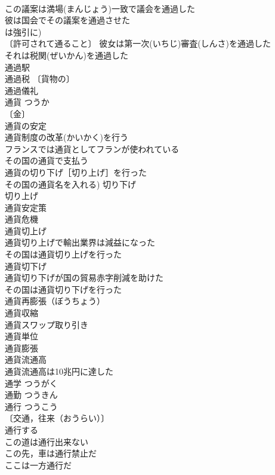 \documentclass[8pt]{extreport}
\begin{document}
\begin{CJK}{UTF8}{min}
\\	この議案は満場(まんじょう)一致で議会を通過した 
\\	彼は国会でその議案を通過させた 
\\	は強引に) 
\\	〔許可されて通ること〕 彼女は第一次(いちじ)審査(しんさ)を通過した 
\\	それは税関(ぜいかん)を通過した 
\\	通過駅 
\\	通過税 〔貨物の〕
\\	通過儀礼 
\\	通貨	つうか	
\\	〔金〕
\\	通貨の安定 
\\	通貨制度の改革(かいかく)を行う 
\\	フランスでは通貨としてフランが使われている 
\\	その国の通貨で支払う 
\\	通貨の切り下げ［切り上げ］を行った 
\\	その国の通貨名を入れる) 切り下げ 
\\	切り上げ 
\\	通貨安定策 
\\	通貨危機 
\\	通貨切上げ 
\\	通貨切り上げで輸出業界は減益になった 
\\	その国は通貨切り上げを行った 
\\	通貨切下げ 
\\	通貨切り下げが国の貿易赤字削減を助けた 
\\	その国は通貨切り下げを行った 
\\	通貨再膨張（ぼうちょう） 
\\	通貨収縮 
\\	通貨スワップ取り引き 
\\	通貨単位 
\\	通貨膨張 
\\	通貨流通高 
\\	通貨流通高は10兆円に達した 
\\	通学	つうがく	
\\	通勤	つうきん	
\\	通行	つうこう	
\\	〔交通，往来（おうらい）〕
\\	通行する 
\\	この道は通行出来ない 
\\	この先，車は通行禁止だ 
\\	ここは一方通行だ 

\end{CJK}
\end{document}
